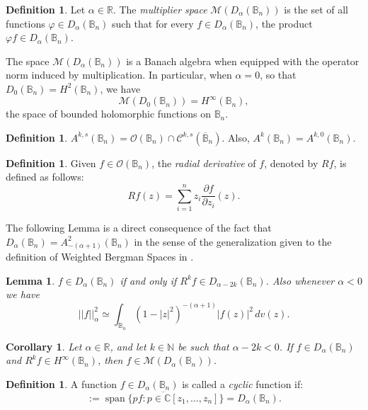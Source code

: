 \documentclass[a4paper,12pt]{amsart}
\newtheorem{lem}[thm]{Lemma}
\newtheorem{cor}[thm]{Corollary}
\theoremstyle{definition}
\newtheorem{defn}[thm]{Definition}
\theoremstyle{remark}
\def\B{\mathbb{B}}
\def\Bn{\mathbb{B}_n}
\begin{document}
\begin{defn}
\label{dalpha}
    Let \( \alpha \in \mathbb{R} \). The \emph{multiplier space} \( \mathcal{M}(D_\alpha(\Bn)) \) is the set of all functions \( \varphi \in D_\alpha(\mathbb{B}_n) \) such that for every \( f \in D_\alpha(\mathbb{B}_n) \), the product \( \varphi f \in D_\alpha(\mathbb{B}_n) \).

    The space \( \mathcal{M}(D_\alpha(\Bn)) \) is a Banach algebra when equipped with the operator norm induced by multiplication. In particular, when \( \alpha = 0 \), so that \( D_0(\mathbb{B}_n) = H^2(\mathbb{B}_n) \), we have
    \[
        \mathcal{M}(D_0(\mathbb{B}_n)) = H^\infty(\mathbb{B}_n),
    \]
    the space of bounded holomorphic functions on \( \mathbb{B}_n \).
\end{defn}

\begin{defn}
    $A^{k,s}(\Bn) = \mathcal{O}(\Bn) \cap \mathcal{C}^{k,s}(\overline{\B}_n)$. Also, $A^{k}(\Bn) = A^{k,0}(\Bn)$. 
\end{defn}

\begin{defn} \label{Def: Radial Derivative}
    Given $f \in \mathcal{O}(\Bn)$, the \emph{radial derivative} of $f$, denoted by $Rf$, is defined as follows:
    \begin{equation*}
        R f (z) = \sum_{i = 1}^n z_i \frac{\partial f}{\partial z_i} (z).
    \end{equation*}
\end{defn}

The following Lemma is a direct consequence of the fact that $D_{\alpha}(\Bn) = A^2_{-(\alpha+1)}(\Bn)$ in the sense of the generalization given to the definition of Weighted Bergman Spaces in \cite{ZhuZhao}.
\begin{lem} \label{RLem}
    $f \in D_{\alpha}(\Bn)$ if and only if $R^k f \in D_{\alpha - 2k}(\Bn)$. Also whenever $\alpha<0$ we have
    \begin{equation} \label{EqvBergNorm}
        || f ||^2_\alpha \simeq \int_{\Bn} (1-|z|^2)^{-(\alpha+1)} |f(z)|^2 \, dv(z).
    \end{equation}
\end{lem}
\begin{cor} \label{MultiplierCor}
    Let \( \alpha \in \mathbb{R} \), and let \( k \in \mathbb{N} \) be such that \( \alpha - 2k < 0 \). If $f \in D_\alpha(\Bn)$ and \( R^k f \in H^\infty(\mathbb{B}_n) \), then \( f \in \mathcal{M}(D_\alpha(\Bn)) \).
\end{cor}
\begin{defn}
    A function $f \in D_\alpha(\Bn)$ is called a \emph{cyclic} function if:
    \begin{equation*}
        [f] := \overline{\operatorname{span} \{ p f : p \in \mathbb{C}[z_1,\ldots,z_n] \}} = D_\alpha(\mathbb{B}_n).
    \end{equation*}
\end{defn}
\end{document}

